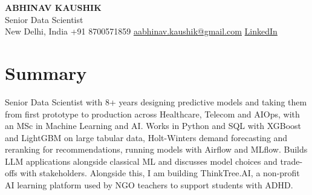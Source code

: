 \documentclass[10pt,a4paper]{article}
\begin{document}
\begin{center}
  {\LARGE\bfseries ABHINAV KAUSHIK}\\[2pt]
  {\large Senior Data Scientist}\\[2pt]
  New Delhi, India \textbar{} +91 8700571859 \textbar{} \href{mailto:aabhinav.kaushik@gmail.com}{aabhinav.kaushik@gmail.com} \textbar{} \href{https://www.linkedin.com/in/abhinav-kaushik10/}{LinkedIn}  
\end{center}

\section{Summary}
Senior Data Scientist with 8+ years designing predictive models and taking them from first prototype to production across Healthcare, Telecom and AIOps, with an MSc in Machine Learning and AI. Works in Python and SQL with XGBoost and LightGBM on large tabular data, Holt-Winters demand forecasting and reranking for recommendations, running models with Airflow and MLflow. Builds LLM applications alongside classical ML and discusses model choices and trade-offs with stakeholders. Alongside this, I am building ThinkTree.AI, a non-profit AI learning platform used by NGO teachers to support students with ADHD.
\end{document}
